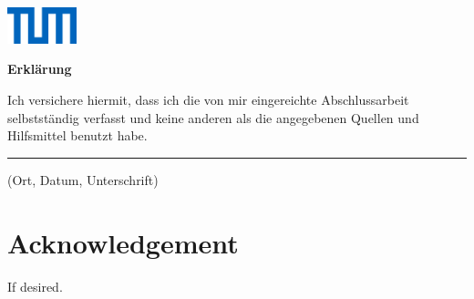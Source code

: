 \documentclass[12pt,a4paper]{article}
\makeatletter
\newcommand{\insertblankpage}{\mbox{}\thispagestyle{empty}\addtocounter{page}{-1}\newpage}
\renewcommand{\cleardoublepage}{\clearpage\if@twoside \ifodd\c@page\else
  \hbox{}
  \vspace*{\fill}
  \thispagestyle{empty}
  \newpage
  \if@twocolumn\hbox{}\newpage\fi\fi\fi}
\newenvironment{changemargin}[2]{%
\begin{list}{}{%
\setlength{\topsep}{0pt}%
\setlength{\leftmargin}{#1}%
\setlength{\rightmargin}{#2}%
\setlength{\listparindent}{\parindent}%
\setlength{\itemindent}{\parindent}%
\setlength{\parsep}{\parskip}%
}%
\item[]}{\end{list}}
\makeatother
\begin{document}
\begin{changemargin}{-1.0cm}{-1.0cm}
\cleardoublepage
\insertblankpage
\raggedright
\begin{flushright}
	\includegraphics[width=20mm]{fig/tum.png}
\end{flushright}

\vspace*{1.5cm}

{\LARGE \textsf{\textbf{\noindent 
		Erkl\"arung }}}
\thispagestyle{empty}
\vspace*{1.5cm}

\begin{onehalfspacing}
\begin{raggedright}
\textsf{\noindent
Ich versichere hiermit, dass ich die von mir eingereichte Abschlussarbeit selbstst\"andig verfasst
und keine anderen als die angegebenen Quellen und Hilfsmittel benutzt habe.}

\vspace{1.5cm}
\flushleft
\rule[-0,5cm]{\textwidth}{0,5pt}
\flushleft
\textsf{(Ort, Datum, Unterschrift)}
\end{raggedright}
\end{onehalfspacing}

\end{changemargin}




\cleardoublepage
\insertblankpage
\section*{Acknowledgement}
If desired.


\cleardoublepage
\insertblankpage
\end{document}
